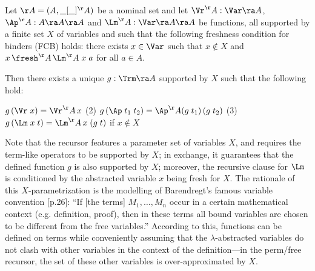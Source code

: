 \begin{thm} \rm \cite{DBLP:conf/lics/GabbayP99,pitts-AlphaStructural}
	\label{thm-pittsRec} 
	Let $\AA = (A,\_[\_]^\AA)$ be a nominal set and let $\Vr^\AA : \Var \ra A$, 
	$\Ap^\AA : A \ra A \ra A$ and 
	$\Lm^\AA : \Var \ra A \ra A$ be functions, 
	all supported by a finite set $X$ of variables and such that the following freshness condition for binders (FCB) holds: there exists $x\in\Var$ such that $x\notin X$ and $x \,\fresh^\AA\, \Lm^\AA\;x\;a$ for all $a \in A$. 
	
	Then there exists a unique %
	$g: \Trm \ra A$ supported by $X$ such that the following hold:
	\begin{myyitem}
		\item[(1)]  $g\,(\Vr\;x) = \Vr^\AA\,x$
		\hspace*{1ex} (2) $g\,(\Ap\;t_1\;t_2) = \Ap^\AA(g\;t_1)\,(g\;t_2)$
			\hspace*{1ex} (3) 
		$g\,(\Lm\;x\;t) = \Lm^\AA\,x\;(g\;t)$ if $x\notin X$ %
	\end{myyitem}
\end{thm}

Note that the recursor features a parameter set of variables $X$, and requires the term-like operators to be supported by $X$; in exchange, it guarantees that the defined function $g$ is also supported by $X$; moreover, the recursive clause for $\Lm$ is conditioned by the abstracted variable $x$ being fresh for $X$.
%
The rationale of this $X$-parametrization is the modelling of 
Barendregt's famous variable convention \cite{bar-lam}[p.26]: 
%
``If [the terms] $M_1,\ldots,M_n$ occur in a certain mathematical context (e.g. definition, proof), then in these terms all bound variables are chosen to be different from the free variables.''
%
According to this, functions can be defined on terms while conveniently assuming that the $\lambda$-abstracted variables do not clash with other %
variables in the context of the definition---in the perm/free recursor, the set of these other variables is over-approximated by $X$. 

